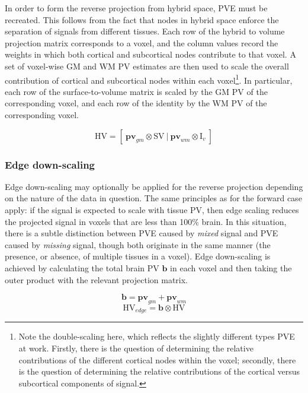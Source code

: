 \documentclass[12pt]{report}
\newcommand{\mat}[1]{\mathrm{#1}}
\renewcommand{\vec}[1]{\mathbf{#1}}
\begin{document}
In order to form the reverse projection from hybrid space, PVE must be recreated. This follows from the fact that nodes in hybrid space enforce the separation of signals from different tissues. Each row of the hybrid to volume projection matrix corresponds to a voxel, and the column values record the weights in which both cortical and subcortical nodes contribute to that voxel. A set of voxel-wise GM and WM PV estimates are then used to scale the overall contribution of cortical and subcortical nodes within each voxel\footnote{Note the double-scaling here, which reflects the slightly different types PVE at work. Firstly, there is the question of determining the relative contributions of the different cortical nodes within the voxel; secondly, there is the question of determining the relative contributions of the cortical versus subcortical components of signal.}. In particular, each row of the surface-to-volume matrix is scaled by the GM PV of the corresponding voxel, and each row of the identity by the WM PV of the corresponding voxel. 

\begin{equation}
\mathrm{HV} = [\ \vec{pv}_{gm} \otimes \mat{SV} \ | \ \vec{pv}_{wm} \otimes \mat{I}_v \ ]
\end{equation}

\subsubsection{Edge down-scaling}

Edge down-scaling may optionally be applied for the reverse projection depending on the nature of the data in question. The same principles as for the forward case apply: if the signal is expected to scale with tissue PV, then edge scaling reduces the projected signal in voxels that are less than 100\% brain. In this situation, there is a subtle distinction between PVE caused by \textit{mixed} signal and PVE caused by \textit{missing} signal, though both originate in the same manner (the presence, or absence, of multiple tissues in a voxel). Edge down-scaling is achieved by calculating the total brain PV $\vec{b}$ in each voxel and then taking the outer product with the relevant projection matrix. 

\begin{equation}
\vec{b} = \vec{pv}_{gm} + \vec{pv}_{wm}
\end{equation}
\begin{equation}
\mathrm{HV}_{edge} = \vec{b} \otimes \mat{HV}
\end{equation}
\end{document}
